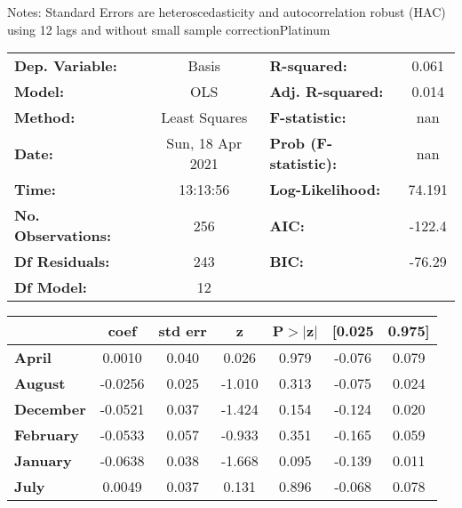 Notes: \newline
 [1] Standard Errors are heteroscedasticity and autocorrelation robust (HAC) using 12 lags and without small sample correctionPlatinum\begin{center}
\begin{tabular}{lclc}
\toprule
\textbf{Dep. Variable:}    &      Basis       & \textbf{  R-squared:         } &     0.061   \\
\textbf{Model:}            &       OLS        & \textbf{  Adj. R-squared:    } &     0.014   \\
\textbf{Method:}           &  Least Squares   & \textbf{  F-statistic:       } &       nan   \\
\textbf{Date:}             & Sun, 18 Apr 2021 & \textbf{  Prob (F-statistic):} &      nan    \\
\textbf{Time:}             &     13:13:56     & \textbf{  Log-Likelihood:    } &    74.191   \\
\textbf{No. Observations:} &         256      & \textbf{  AIC:               } &    -122.4   \\
\textbf{Df Residuals:}     &         243      & \textbf{  BIC:               } &    -76.29   \\
\textbf{Df Model:}         &          12      & \textbf{                     } &             \\
\bottomrule
\end{tabular}
\begin{tabular}{lcccccc}
                   & \textbf{coef} & \textbf{std err} & \textbf{z} & \textbf{P$> |$z$|$} & \textbf{[0.025} & \textbf{0.975]}  \\
\midrule
\textbf{April}     &       0.0010  &        0.040     &     0.026  &         0.979        &       -0.076    &        0.079     \\
\textbf{August}    &      -0.0256  &        0.025     &    -1.010  &         0.313        &       -0.075    &        0.024     \\
\textbf{December}  &      -0.0521  &        0.037     &    -1.424  &         0.154        &       -0.124    &        0.020     \\
\textbf{February}  &      -0.0533  &        0.057     &    -0.933  &         0.351        &       -0.165    &        0.059     \\
\textbf{January}   &      -0.0638  &        0.038     &    -1.668  &         0.095        &       -0.139    &        0.011     \\
\textbf{July}      &       0.0049  &        0.037     &     0.131  &         0.896        &       -0.068    &        0.078     \\

\end{tabular}
\end{center}
